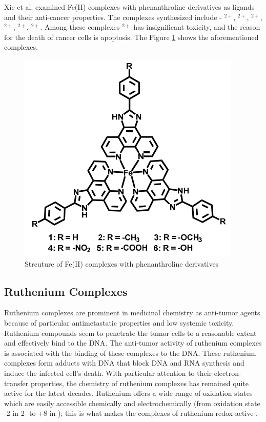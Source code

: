 \hspace{0.1cm}Xie et al. \cite{xie2017anticancer} examined Fe(II) complexes with phenanthroline derivatives as ligands and their anti-cancer properties. The complexes synthesized include -  \ce{[Fe(II)(pip)3]}$^{2+}$, \ce{[Fe(II)(pip-CH3)3]}$^{2+}$, $^{2+}$, \ce{[Fe(II)(pip-NO2)3]}$^{2+}$, $^{2+}$, \ce{[Fe(II)(pip-OH)3]}$^{2+}$. Among these complexes $^{2+}$ has insignificant toxicity, and the reason for the death of cancer cells is apoptosis. The Figure \ref{fig:ironthree} shows the aforementioned complexes.

\begin{figure}[!ht]
    \centering
    \includegraphics[scale = 0.7]{ironthree.png}
    \caption{Strcuture of Fe(II) complexes with phenanthroline derivatives}
    \label{fig:ironthree}
\end{figure}

\subsection{Ruthenium Complexes}
Ruthenium complexes are prominent in medicinal chemistry as anti-tumor agents because of particular antimetastatic properties and low systemic toxicity. Ruthenium compounds seem to penetrate the tumor cells to a reasonable extent and effectively bind to the DNA. The anti-tumor activity of ruthenium complexes is associated with the binding of these complexes to the DNA. These ruthenium complexes form adducts with DNA that block DNA and RNA synthesis and induce the infected cell's death. With particular attention to their electron-transfer properties, the chemistry of ruthenium complexes has remained quite active for the latest decades. Ruthenium offers a wide range of oxidation states which are easily accessible chemically and electrochemically (from oxidation state -2 in \ce{[Ru(CO)4]} 2- to +8 in ); this is what makes the complexes of ruthenium redox-active \cite{kostova2006ruthenium}.

